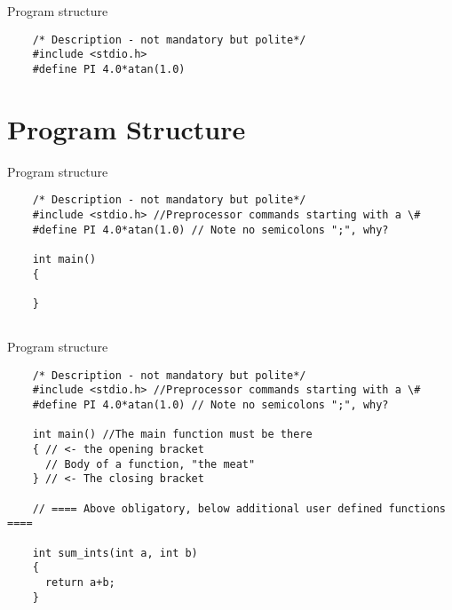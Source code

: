 \documentclass[10pt]{beamer}
\begin{document}
\begin{frame}[fragile]{Program structure}

    \begin{lstlisting}
    /* Description - not mandatory but polite*/
    #include <stdio.h>
    #define PI 4.0*atan(1.0)
    \end{lstlisting}
    \vspace{0.2cm}

\end{frame}

\section{Program Structure}

\begin{frame}[fragile]{Program structure}
    \begin{lstlisting}
    /* Description - not mandatory but polite*/
    #include <stdio.h> //Preprocessor commands starting with a \#
    #define PI 4.0*atan(1.0) // Note no semicolons ";", why?
       
    int main()
    {
     
    }
       
    \end{lstlisting}
 
\end{frame}

\begin{frame}[fragile]{Program structure}
    \begin{lstlisting}
    /* Description - not mandatory but polite*/
    #include <stdio.h> //Preprocessor commands starting with a \#
    #define PI 4.0*atan(1.0) // Note no semicolons ";", why?
     
    int main() //The main function must be there
    { // <- the opening bracket
      // Body of a function, "the meat"
    } // <- The closing bracket
   
    // ==== Above obligatory, below additional user defined functions ====
   
    int sum_ints(int a, int b)
    {
      return a+b;
    }    
    \end{lstlisting}
 
\end{frame}
\end{document}

